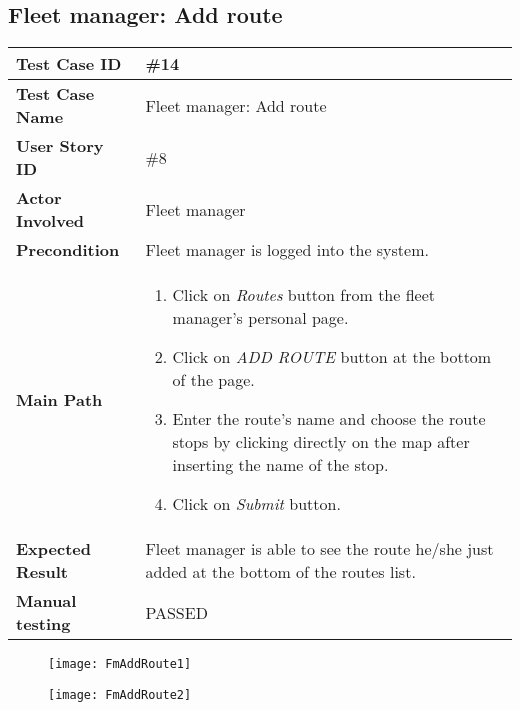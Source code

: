 \subsection{Fleet manager: Add route}
\begin{center}
	\begin{tabular} { | m{3.5cm} | m{9.5cm} | }
		\hline
		\textbf{Test Case ID} & \#14\\
		\hline
		\textbf{Test Case Name} & Fleet manager: Add route\\
		\hline
		\textbf{User Story ID} & \#8 \\
		\hline
		\textbf{Actor Involved} & Fleet manager\\
		\hline
		\textbf{Precondition} & Fleet manager is logged into the system.\\
		\hline
		\textbf{Main Path} & 
		\begin{enumerate}
			\item Click on \textit{Routes} button from the fleet manager's personal page.
			\item Click on \textit{ADD ROUTE} button at the bottom of the page.
			\item Enter the route's name and choose the route stops by clicking directly on the map after inserting the name of the stop.
			\item Click on \textit{Submit} button.
		\end{enumerate}\\
		\hline
		\textbf{Expected Result} & Fleet manager is able to see the route he/she just added at the bottom of the routes list.\\
		\hline
	\textbf{Manual testing} & PASSED\\
	\hline
\end{tabular}
\end{center}
\begin{figure}[H]
\centering
\texttt{[image: FmAddRoute1]}
\end{figure}
\begin{figure}[H]
\centering
\texttt{[image: FmAddRoute2]}
\end{figure}
\newpage
